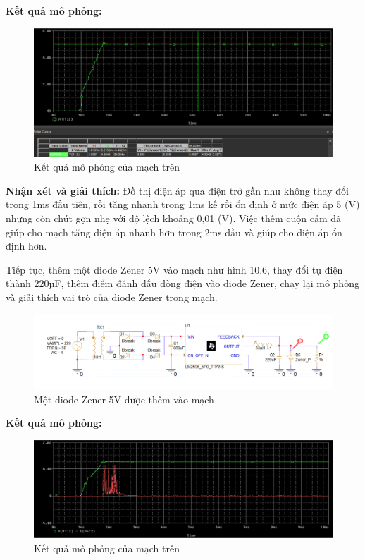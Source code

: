 \textbf{Kết quả mô phỏng: }

\begin{figure}[ht]
    \centering
    \includegraphics[scale=0.22]{graphics/ex10/f7.png}
    \caption{Kết quả mô phỏng của mạch trên}
\end{figure}

\textbf{Nhận xét và giải thích:} Đồ thị điện áp qua điện trở gần như không thay đổi trong 1ms đầu tiên, rồi tăng nhanh trong 1ms kế rồi ổn định ở mức điện áp 5 (V) nhưng còn chút gợn nhẹ với độ lệch khoảng 0,01 (V). Việc thêm cuộn cảm đã giúp cho mạch tăng điện áp nhanh hơn trong 2ms đầu và giúp cho điện áp ổn định hơn.
\pagebreak

Tiếp tục, thêm một diode Zener 5V vào mạch như hình 10.6, thay đổi tụ điện thành 220µF, thêm điểm đánh dấu dòng điện vào diode Zener, chạy lại mô phỏng và giải thích
vai trò của diode Zener trong mạch.

\begin{figure}[ht]
    \centering
    \includegraphics[scale=0.24]{graphics/ex10/f5.png}
    \caption{Một diode Zener 5V được thêm vào mạch}
\end{figure}

\textbf{Kết quả mô phỏng: }

\begin{figure}[ht]
    \centering
    \includegraphics[scale=0.22]{graphics/ex10/f8.png}
    \caption{Kết quả mô phỏng của mạch trên}
\end{figure}


